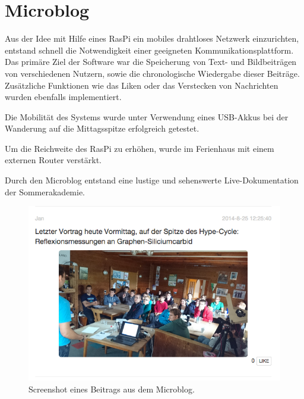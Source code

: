 \documentclass[
  captions=tableheading,  %
  titlepage=false, %
  twocolumn,
  headings=small,
]{scrartcl}
\begin{document}
\section*{Microblog}
Aus der Idee mit Hilfe eines RasPi ein mobiles drahtloses Netzwerk einzurichten, entstand schnell die Notwendigkeit einer geeigneten Kommunikationsplattform.
Das primäre Ziel der Software war die Speicherung von Text- und Bildbeiträgen von verschiedenen Nutzern, sowie die chronologische Wiedergabe dieser Beiträge.
Zusätzliche Funktionen wie das Liken oder das Verstecken von Nachrichten wurden ebenfalls implementiert.

Die Mobilität des Systems wurde unter Verwendung eines USB-Akkus bei der Wanderung auf die Mittagsspitze erfolgreich getestet.

Um die Reichweite des RasPi zu erhöhen, wurde im Ferienhaus mit einem externen Router verstärkt.

Durch den Microblog entstand eine lustige und sehenswerte Live-Dokumentation der Sommerakademie.
\begin{figure}
  \centering
  \includegraphics[width=\linewidth]{./images/microblog_screenshot.png}
  \caption{Screenshot eines Beitrags aus dem Microblog.}
\end{figure}
\end{document}
